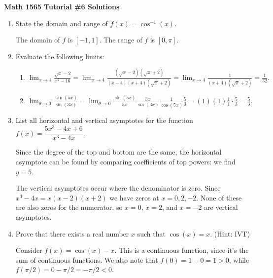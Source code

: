 \documentclass[12pt]{article}
\newcommand{\di}{\displaystyle}
\begin{document}
\begin{center}
\textbf{Math 1565 Tutorial \#6 Solutions}
\end{center}

\begin{enumerate}
  \item State the domain and range of $f(x) = \cos^{-1}(x)$. 
 
\bigskip

The domain of $f$ is $[-1,1]$. The range of $f$ is $[0,\pi]$.

\bigskip
 
 
 \item Evaluate the following limits:
 \begin{enumerate}
 \item $\di \lim_{x\to 4}\frac{\sqrt{x}-2}{x^2-16} = \lim_{x\to 4}\frac{(\sqrt{x}-2)(\sqrt{x}+2)}{(x-4)(x+4)(\sqrt{x}+2)} = \lim_{x\to 4}\frac{1}{(x+4)(\sqrt{x}+2)}  = \frac{1}{32}. $ 
 
 \vspace{1cm}
 
 \item $\di \lim_{\theta\to 0}\frac{\tan(5x)}{\sin(3x)} = \lim_{\theta\to 0}\frac{\sin(5x)}{5x}\frac{3x}{\sin(3x)}\frac{1}{\cos(5x)}\frac{5}{3} = (1)(1)\frac{1}{1}\cdot\frac{5}{3}=\frac{5}{3}.$
 \end{enumerate}
 
 \vspace{1cm}
 
 \item List all horizontal and vertical asymptotes for the function $f(x) = \dfrac{5x^3-4x+6}{x^3-4x}$. 

\bigskip

Since the degree of the top and bottom are the same, the horizontal asymptote can be found by comparing coefficients of top powers: we find $y=5$.

The vertical asymptotes occur where the denominator is zero. Since $x^3-4x=x(x-2)(x+2)$ we have zeros at $x=0, 2, -2$. None of these are also zeros for the numerator, so $x=0$, $x=2$, and $x=-2$ are vertical asymptotes.

\bigskip

 \item Prove that there exists a real number $x$ such that $\cos(x)=x$. (Hint: IVT)
 
 \bigskip
 
Consider $f(x)=\cos(x)-x$. This is a continuous function, since it's the sum of continuous functions. We also note that $f(0)=1-0=1>0$, while $f(\pi/2) = 0-\pi/2 = -\pi/2 <0$.


\end{enumerate}
\end{document}
